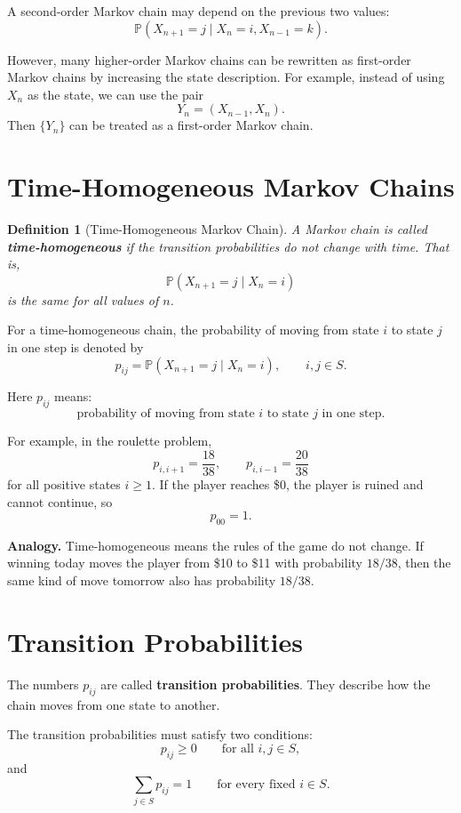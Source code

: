 \documentclass[12pt,a4paper]{article}
\theoremstyle{lecturestyle}
\newtheorem{definition}{Definition}
\newcommand{\Prob}{\mathbb{P}}
\begin{document}
A second-order Markov chain may depend on the previous two values:
\[
\Prob(X_{n+1}=j \mid X_n=i, X_{n-1}=k).
\]

However, many higher-order Markov chains can be rewritten as first-order Markov chains by increasing the state description. For example, instead of using $X_n$ as the state, we can use the pair
\[
Y_n=(X_{n-1},X_n).
\]
Then $\{Y_n\}$ can be treated as a first-order Markov chain.

\section{Time-Homogeneous Markov Chains}

\begin{definition}[Time-Homogeneous Markov Chain]
A Markov chain is called \textbf{time-homogeneous} if the transition probabilities do not change with time. That is,
\[
\Prob(X_{n+1}=j\mid X_n=i)
\]
is the same for all values of $n$.
\end{definition}

For a time-homogeneous chain, the probability of moving from state $i$ to state $j$ in one step is denoted by
\[
p_{ij}=\Prob(X_{n+1}=j\mid X_n=i), \qquad i,j\in S.
\]

Here $p_{ij}$ means:
\[
\text{probability of moving from state } i \text{ to state } j \text{ in one step.}
\]

For example, in the roulette problem,
\[
p_{i,i+1}=\frac{18}{38}, \qquad p_{i,i-1}=\frac{20}{38}
\]
for all positive states $i\geq 1$. If the player reaches \$0, the player is ruined and cannot continue, so
\[
p_{00}=1.
\]

\textbf{Analogy.} Time-homogeneous means the rules of the game do not change. If winning today moves the player from \$10 to \$11 with probability $18/38$, then the same kind of move tomorrow also has probability $18/38$.

\section{Transition Probabilities}

The numbers $p_{ij}$ are called \textbf{transition probabilities}. They describe how the chain moves from one state to another.

The transition probabilities must satisfy two conditions:
\[
p_{ij}\geq 0 \qquad \text{for all } i,j\in S,
\]
and
\[
\sum_{j\in S}p_{ij}=1 \qquad \text{for every fixed } i\in S.
\]
\end{document}
